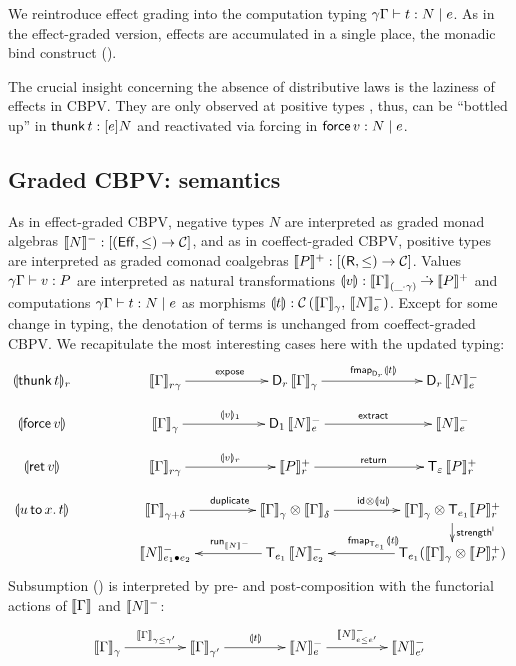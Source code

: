 \documentclass[acmsmall,review,anonymous]{acmart}\settopmatter{printfolios=true,printccs=false,printacmref=false}
\theoremstyle{remark}
\begin{document}
We reintroduce effect grading into the computation typing
$\qeCompTy \gamma \Gamma t e N$.  As in the effect-graded version,
effects are accumulated in a single place, the monadic bind construct
(\relim\diamond).

The crucial insight concerning the absence of distributive laws is the
laziness of effects in CBPV.  They are only observed at positive
types \citep{levy:hosc06},
thus, can be ``bottled up'' in $\thunk t : \thunkty e N$ and
reactivated via forcing in $\force v : N \mid e$.


\subsection{Graded CBPV: semantics}

As in effect-graded CBPV, negative types $N$ are interpreted as graded
monad algebras $\denn N : [(\Eff,\leq) \to \CC]$, and as in
coeffect-graded CBPV, positive types are interpreted as graded comonad
coalgebras $\denp P : [(\R,\leq) \to \CC]$.  Values
$\qValTy \gamma \Gamma v P$ are interpreted as natural transformations
$\dent v : \Denpar \Gamma {\_\cdot\gamma} \todot \denp P$ and
computations $\qeCompTy \gamma \Gamma t e N$ as morphisms
$\dent t : \Hom {\Den\Gamma \gamma} {\Denn N e}$.  Except for some
change in typing, the denotation of terms is unchanged from
coeffect-graded CBPV.  We recapitulate the most interesting cases here
with the updated typing:
\[
\xymatrix@C=10ex@R=3ex{
\denv {\thunk t} r
& \Den \Gamma {r\gamma}     \ar[r]^{\expose}
& \D[r]\,\Den\Gamma\gamma   \ar[r]^{\fmapt[{\D[r]}]{\dent t}}
& \D[r]\,\Denn N e
\\
\dent {\force v}
& \Den \Gamma \gamma    \ar[r]^{\denv v 1}
& \D[1]\,\Denn N e      \ar[r]^{\extract}
& \Denn N e
\\
\dent {\ret v}
& \Den \Gamma {r\gamma}  \ar[r]^{\denv v r}
& \Denp P r              \ar[r]^{\treturn}
& \T[\Ge]\,\Denp P r
\\
\dent {\bind x u t}
& \Den \Gamma {\gamma + \delta}                 \ar[r]^{\duplicate}
& \Den \Gamma \gamma \otimes \Den \Gamma \delta \ar[r]^{\tid \otimes \dent u}
& \Den \Gamma \gamma \otimes \T[e_1] \Denp P r  \ar[d]^{\strengthl}
\\
& \Denn N {e_1 \bu e_2}
& \T[e_1]\,\Denn N {e_2}                        \ar[l]_{\run[\denn N]}
& \T[e_1](\Den \Gamma \gamma \otimes \Denp P r) \ar[l]_{\fmapt[{\T[e_1]}] {\dent t}}
}
\]
Subsumption (\rsub) is interpreted by pre- and post-composition with
the functorial actions of $\den \Gamma$ and $\denn N$:
\[
\xymatrix@C=10ex{
\Den \Gamma {\gamma}   \ar[r]^{\Den\Gamma{\gamma \leq \gamma'}}
& \Den \Gamma {\gamma'}  \ar[r]^{\dent t}
& \Denn N e              \ar[r]^{\Denn N {e \leq e'}}
& \Denn N {e'}
}
\]
\end{document}
